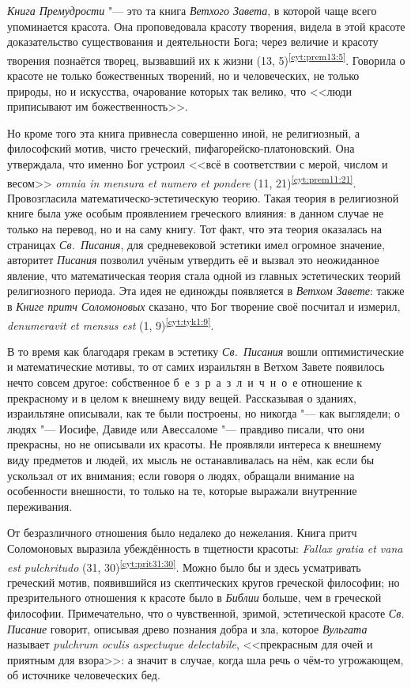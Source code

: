  \emph{Книга Премудрости} "--- это та книга \emph{Ветхого Завета}, в которой чаще всего упоминается красота. Она проповедовала красоту творения, видела в этой красоте доказательство существования и деятельности Бога; через величие и красоту творения познаётся творец, вызвавший их к жизни (13, 5)\textsuperscript{\ref{cyt:prem13:5}}. Говорила о  красоте не только божественных творений, но и человеческих, не только природы, но и искусства, очарование которых так велико, что <<люди приписывают им божественность>>.

Но кроме того эта книга привнесла совершенно иной, не религиозный, а философский мотив, чисто греческий, пифагорейско-платоновский.  Она утверждала, что именно Бог устроил <<всё в соответствии с мерой, числом и весом>> {\sl omnia in mensura et numero et pondere} (11, 21)\textsuperscript{\ref{cyt:prem11:21}}. Провозгласила математическо-эстетическую теорию. Такая теория в религиозной книге была уже особым проявлением греческого влияния: в данном случае не только на перевод, но и на саму книгу. Тот факт, что эта теория оказалась на страницах \emph{Св.~Писания}, для средневековой эстетики имел огромное значение, авторитет \emph{Писания} позволил учёным утвердить её и вызвал это неожиданное явление, что математическая теория стала одной из главных эстетических теорий религиозного периода. Эта идея не единожды появляется в \emph{Ветхом Завете}: также в \emph{Книге притч Соломоновых} сказано, что Бог творение своё посчитал и измерил, {\sl denumeravit et mensus est} (1, 9)\textsuperscript{\ref{cyt:tyk1:9}}.

В то время как благодаря грекам в эстетику \emph{Св.~Писания} вошли оптимистические и математические мотивы, то от самих израильтян в Ветхом Завете появилось нечто совсем другое: собственное б~е~з~р~а~з~л~и~ч~н~о~е отношение к прекрасному и в целом к внешнему виду вещей. Рассказывая о зданиях, израильтяне описывали, как те были построены, но никогда "--- как выглядели; о людях "--- Иосифе, Давиде или Авессаломе "--- правдиво писали, что они прекрасны, но не описывали их красоты. Не проявляли интереса к внешнему виду предметов и людей, их мысль не останавливалась на нём, как если бы ускользал от их внимания; если говоря о людях, обращали внимание на особенности внешности, то только на те, которые выражали внутренние переживания.

От безразличного отношения было недалеко до нежелания. Книга притч Соломоновых выразила убеждённость в тщетности красоты: {\sl Fallax gratia et vana est pulchritudo} (31, 30)\textsuperscript{\ref{cyt:prit31:30}}. Можно было бы и здесь усматривать греческий мотив, появившийся из скептических кругов греческой философии; но презрительного отношения к красоте было в \emph{Библии} больше, чем в греческой философии. Примечательно, что о чувственной, зримой, эстетической красоте \emph{Св. Писание} говорит, описывая древо познания добра и зла, которое \emph{Вульгата} называет {\sl pulchrum oculis aspectuque delectabile}, <<прекрасным для очей и приятным для взора>>: а значит в случае, когда шла речь о чём-то угрожающем, об источнике человеческих бед.

